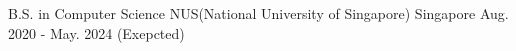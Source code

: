 

\begin{cventries}

  \cventry
    {B.S. in Computer Science} %
    {NUS(National University of Singapore)} %
    {Singapore} %
    {Aug. 2020 - May. 2024 (Exepcted)} %
    {}


\end{cventries}

